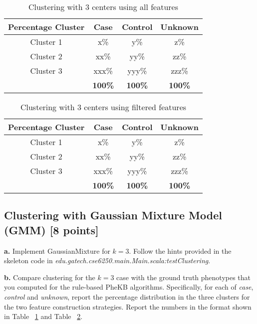 \documentclass[12pt]{article}
\begin{document}
\begin{table}[h]
\centering
\begin{tabular}{ c | c | c | c }
  \hline
  Percentage Cluster & Case & Control & Unknown\\
  \hline                       
  Cluster 1 & x\% & y\% & z\% \\
  Cluster 2 & xx\% & yy\% & zz\% \\
  Cluster 3 & xxx\% & yyy\% & zzz\% \\
  \hline  
   & \bf{100\%} & \bf{100\%} & \bf{100\%} \\
  \hline  
\end{tabular}
\caption{Clustering with 3 centers using all features}
\label{tbl:kmeansall}
\end{table}

\begin{table}[h]
\centering
\begin{tabular}{ c | c | c | c }
  \hline
  Percentage Cluster & Case & Control & Unknown\\
  \hline                       
  Cluster 1 & x\% & y\% & z\% \\
  Cluster 2 & xx\% & yy\% & zz\% \\
  Cluster 3 & xxx\% & yyy\% & zzz\% \\
  \hline  
   & \bf{100\%} & \bf{100\%} & \bf{100\%} \\
  \hline  
\end{tabular}
\caption{Clustering with 3 centers using filtered features}
\label{tbl:kmeansfil}
\end{table}

\subsection{Clustering with Gaussian Mixture Model (GMM) [8 points]}

\textbf{a.} Implement GaussianMixture for $k=3$. Follow the hints provided in the skeleton code in \textit{edu.gatech.cse6250.main.Main.scala:testClustering}.

\textbf{b.} Compare clustering for the $k=3$ case with the ground truth phenotypes that you computed for the rule-based PheKB algorithms. Specifically, for each of \textit{case}, \textit{control} and \textit{unknown}, report the percentage distribution in the three clusters for the two feature construction strategies. Report the numbers in the format shown in Table ~\ref{tbl:kmeansall} and Table ~\ref{tbl:kmeansfil}. \\
\end{document}
